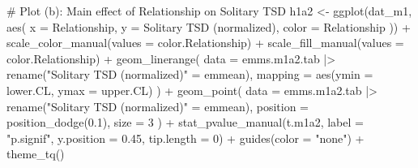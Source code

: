 \documentclass[
  bookmarksnumbered]{article}
\newenvironment{Shaded}{\begin{snugshade}}{\end{snugshade}}
\newcommand{\AttributeTok}[1]{\textcolor[rgb]{0.80,0.80,0.80}{#1}}
\newcommand{\CommentTok}[1]{\textcolor[rgb]{0.50,0.62,0.50}{#1}}
\newcommand{\DecValTok}[1]{\textcolor[rgb]{0.86,0.86,0.80}{#1}}
\newcommand{\FloatTok}[1]{\textcolor[rgb]{0.75,0.75,0.82}{#1}}
\newcommand{\FunctionTok}[1]{\textcolor[rgb]{0.94,0.94,0.56}{#1}}
\newcommand{\NormalTok}[1]{\textcolor[rgb]{0.80,0.80,0.80}{#1}}
\newcommand{\OtherTok}[1]{\textcolor[rgb]{0.94,0.94,0.56}{#1}}
\newcommand{\SpecialCharTok}[1]{\textcolor[rgb]{0.86,0.64,0.64}{#1}}
\newcommand{\StringTok}[1]{\textcolor[rgb]{0.80,0.58,0.58}{#1}}
\begin{document}
\begin{Shaded}
\begin{Highlighting}[]
\CommentTok{\# Plot (b): Main effect of Relationship on Solitary TSD}
\NormalTok{h1a2 }\OtherTok{\textless{}{-}} \FunctionTok{ggplot}\NormalTok{(dat\_m1, }\FunctionTok{aes}\NormalTok{(}
  \AttributeTok{x =}\NormalTok{ Relationship, }\AttributeTok{y =} \StringTok{\textasciigrave{}}\AttributeTok{Solitary TSD (normalized)}\StringTok{\textasciigrave{}}\NormalTok{, }\AttributeTok{color =}\NormalTok{ Relationship}
\NormalTok{)) }\SpecialCharTok{+}
  \FunctionTok{scale\_color\_manual}\NormalTok{(}\AttributeTok{values =}\NormalTok{ color.Relationship) }\SpecialCharTok{+}
  \FunctionTok{scale\_fill\_manual}\NormalTok{(}\AttributeTok{values =}\NormalTok{ color.Relationship) }\SpecialCharTok{+}
  \FunctionTok{geom\_linerange}\NormalTok{(}
    \AttributeTok{data =}\NormalTok{ emms.m1a2.tab }\SpecialCharTok{|\textgreater{}} \FunctionTok{rename}\NormalTok{(}\StringTok{"Solitary TSD (normalized)"} \OtherTok{=}\NormalTok{ emmean),}
    \AttributeTok{mapping =} \FunctionTok{aes}\NormalTok{(}\AttributeTok{ymin =}\NormalTok{ lower.CL, }\AttributeTok{ymax =}\NormalTok{ upper.CL)}
\NormalTok{  ) }\SpecialCharTok{+}
  \FunctionTok{geom\_point}\NormalTok{(}
    \AttributeTok{data =}\NormalTok{ emms.m1a2.tab }\SpecialCharTok{|\textgreater{}} \FunctionTok{rename}\NormalTok{(}\StringTok{"Solitary TSD (normalized)"} \OtherTok{=}\NormalTok{ emmean),}
    \AttributeTok{position =} \FunctionTok{position\_dodge}\NormalTok{(}\FloatTok{0.1}\NormalTok{), }\AttributeTok{size =} \DecValTok{3}
\NormalTok{  ) }\SpecialCharTok{+}
  \FunctionTok{stat\_pvalue\_manual}\NormalTok{(t.m1a2, }\AttributeTok{label =} \StringTok{"p.signif"}\NormalTok{, }\AttributeTok{y.position =} \FloatTok{0.45}\NormalTok{, }\AttributeTok{tip.length =} \DecValTok{0}\NormalTok{) }\SpecialCharTok{+}
  \FunctionTok{guides}\NormalTok{(}\AttributeTok{color =} \StringTok{"none"}\NormalTok{) }\SpecialCharTok{+}
  \FunctionTok{theme\_tq}\NormalTok{()}


\end{Highlighting}
\end{Shaded}
\end{document}
